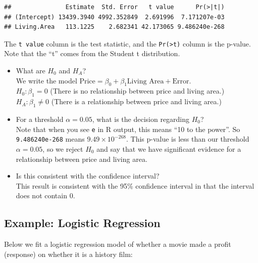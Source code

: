 \documentclass[
]{book}
\newenvironment{Shaded}{\begin{snugshade}}{\end{snugshade}}
\newcommand{\CommentTok}[1]{\textcolor[rgb]{0.56,0.35,0.01}{\textit{#1}}}
\newcommand{\DataTypeTok}[1]{\textcolor[rgb]{0.13,0.29,0.53}{#1}}
\newcommand{\KeywordTok}[1]{\textcolor[rgb]{0.13,0.29,0.53}{\textbf{#1}}}
\newcommand{\NormalTok}[1]{#1}
\newcommand{\OperatorTok}[1]{\textcolor[rgb]{0.81,0.36,0.00}{\textbf{#1}}}
\newcommand{\OtherTok}[1]{\textcolor[rgb]{0.56,0.35,0.01}{#1}}
\newcommand{\StringTok}[1]{\textcolor[rgb]{0.31,0.60,0.02}{#1}}
\providecommand{\tightlist}{%
  \setlength{\itemsep}{0pt}\setlength{\parskip}{0pt}}
\begin{document}
\begin{verbatim}
##               Estimate  Std. Error   t value      Pr(>|t|)
## (Intercept) 13439.3940 4992.352849  2.691996  7.171207e-03
## Living.Area   113.1225    2.682341 42.173065 9.486240e-268
\end{verbatim}

The \texttt{t\ value} column is the test statistic, and the \texttt{Pr(\textgreater{}\textbar{}t\textbar{})} column is the p-value. Note that the ``t'' comes from the Student t distribution.

\begin{itemize}
\tightlist
\item
  What are \(H_0\) and \(H_A\)?\\
  We write the model \(\text{Price} = \beta_0 + \beta_1\text{Living Area} + \text{Error}\).\\
  \(H_0: \beta_1 = 0\) (There is no relationship between price and living area.)\\
  \(H_A: \beta_1 \neq 0\) (There is a relationship between price and living area.)\\
\item
  For a threshold \(\alpha = 0.05\), what is the decision regarding \(H_0\)?\\
  Note that when you see \texttt{e} in R output, this means ``10 to the power''. So \texttt{9.486240e-268} means \(9.49 \times 10^{-268}\). This p-value is less than our threshold \(\alpha = 0.05\), so we reject \(H_0\) and say that we have significant evidence for a relationship between price and living area.
\item
  Is this consistent with the confidence interval?\\
  This result is consistent with the 95\% confidence interval in that the interval does not contain 0.
\end{itemize}

\hypertarget{example-logistic-regression}{%
\subsection{Example: Logistic Regression}\label{example-logistic-regression}}

Below we fit a logistic regression model of whether a movie made a profit (response) on whether it is a history film:

\begin{Shaded}
\end{Shaded}
\end{document}
